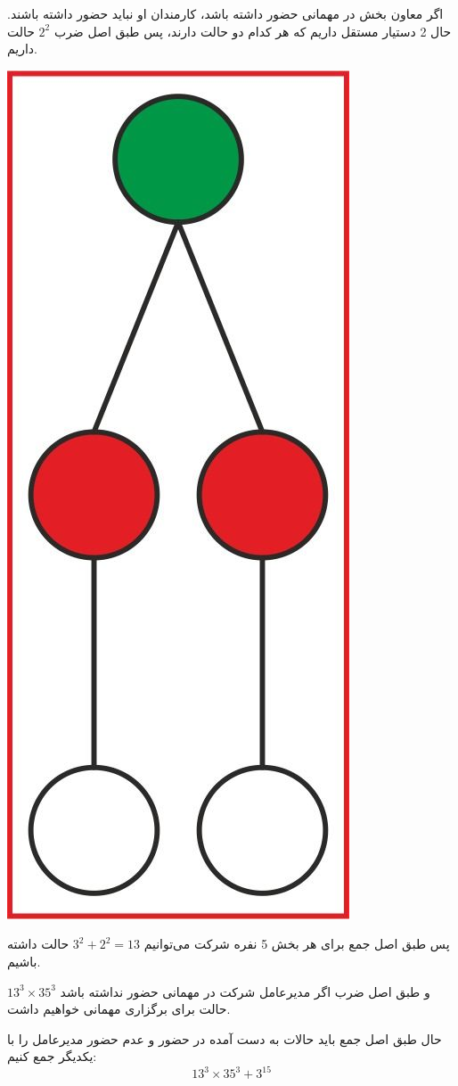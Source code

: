     اگر معاون بخش در مهمانی حضور داشته باشد، کارمندان او نباید حضور داشته باشند. حال 2 دستیار مستقل داریم که هر کدام دو حالت دارند، پس طبق اصل ضرب $2^2$ حالت داریم.
    \begin{center}
    	\includegraphics[scale=0.1]{./7.jpg}
    \end{center}
    
    پس طبق اصل جمع برای هر بخش 5 نفره شرکت می‌توانیم $ 3^2 + 2^2 = 13 $ حالت داشته باشیم.
    
    و طبق اصل ضرب اگر مدیرعامل شرکت در مهمانی حضور نداشته باشد $ 13^3 \times  35 ^ 3 $ حالت برای برگزاری مهمانی خواهیم داشت.
    
    حال طبق اصل جمع باید حالات به دست آمده در حضور و عدم حضور مدیرعامل را با یکدیگر جمع کنیم:   
    $$13^3 \times  35 ^ 3  + 3^{15}$$

